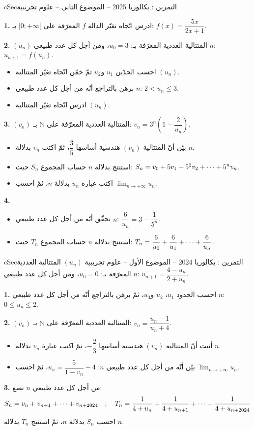 \documentclass[12pt,a4paper]{article}
\newenvironment{BOX}[2]{\begin{otherlanguage}{english}\begin{arbox}{#1}{#2}}{\end{arbox}\end{otherlanguage}}
\newcounter{exo}
\newenvironment{tamrin}[1]{\stepcounter{exo}\begin{BOX}{cSec}{التمرين \theexo: #1}}{\end{BOX}}
\renewcommand{\cdots}{\mathinner{\cdotp\cdotp\cdotp}}
\newcommand{\N}{\mathbb{N}}
\newcommand{\limn}{\displaystyle\lim_{n\to+\infty}}
\newenvironment{sq}{\begin{itemize}[leftmargin=2.4em,itemsep=3pt]}{\end{itemize}}
\newcommand{\qa}{\item[(أ)]}\newcommand{\qb}{\item[(ب)]}\newcommand{\qc}{\item[(جـ)]}\newcommand{\qd}{\item[(د)]}\newcommand{\qe}{\item[(هـ)]}
\newcommand{\QQ}[1]{\par\smallskip\textbf{#1.} }
\begin{document}
\begin{tamrin}{بكالوريا 2025 -- الموضوع الثاني -- علوم تجريبية}
\QQ{1} ادرس اتّجاه تغيّر الدالة $f$ المعرّفة على $[0;+\infty[$ بـ: $f(x)=\dfrac{5x}{2x+1}$.

\QQ{2} $(u_n)$ المتتالية العددية المعرّفة بـ: $u_0=3$، ومن أجل كل عدد طبيعي $n$: $u_{n+1}=f(u_n)$.
\begin{sq}
\qa احسب الحدّين $u_1$ و$u_2$ ثمّ خمّن اتّجاه تغيّر المتتالية $(u_n)$.
\qb برهن بالتراجع أنّه من أجل كل عدد طبيعي $n$: $2<u_n\leqslant 3$.
\qc ادرس اتّجاه تغيّر المتتالية $(u_n)$.
\end{sq}
\QQ{3} $(v_n)$ المتتالية العددية المعرّفة على $\N$ بـ: $v_n=3^n\left(1-\dfrac{2}{u_n}\right)$.
\begin{sq}
\qa بيّن أنّ المتتالية $(v_n)$ هندسية أساسها $\dfrac35$، ثمّ اكتب $v_n$ بدلالة $n$.
\qb استنتج بدلالة $n$ حساب المجموع $S_n$ حيث: $S_n=v_0+5v_1+5^2v_2+\cdots+5^nv_n$.
\qc اكتب عبارة $u_n$ بدلالة $n$، ثمّ احسب $\limn u_n$.
\end{sq}
\QQ{4}
\begin{sq}
\qa تحقّق أنّه من أجل كل عدد طبيعي $n$: $\dfrac{6}{u_n}=3-\dfrac{1}{5^n}$.
\qb استنتج بدلالة $n$ حساب المجموع $T_n$ حيث: $T_n=\dfrac{6}{u_0}+\dfrac{6}{u_1}+\cdots+\dfrac{6}{u_n}$.
\end{sq}
\end{tamrin}

\begin{tamrin}{بكالوريا 2024 -- الموضوع الأول -- علوم تجريبية}
$(u_n)$ المتتالية العددية المعرّفة بـ: $u_0=0$، ومن أجل كل عدد طبيعي $n$: $u_{n+1}=\dfrac{4-u_n}{2+u_n}$.

\QQ{1} احسب الحدود $u_1$، $u_2$ و$u_3$، ثمّ برهن بالتراجع أنّه من أجل كل عدد طبيعي $n$: $0\leqslant u_n\leqslant 2$.

\QQ{2} $(v_n)$ المتتالية العددية المعرّفة على $\N$ بـ: $v_n=\dfrac{u_n-1}{u_n+4}$.
\begin{sq}
\qa أثبت أنّ المتتالية $(v_n)$ هندسية أساسها $-\dfrac23$، ثمّ اكتب عبارة $v_n$ بدلالة $n$.
\qb بيّن أنّه من أجل كل عدد طبيعي $n$: $u_n=\dfrac{5}{1-v_n}-4$، ثمّ احسب $\limn u_n$.
\end{sq}
\QQ{3} من أجل كل عدد طبيعي $n$ نضع:
\[S_n=v_n+v_{n+1}+\cdots+v_{n+2024}\quad;\quad T_n=\frac{1}{4+u_n}+\frac{1}{4+u_{n+1}}+\cdots+\frac{1}{4+u_{n+2024}}\]
احسب $S_n$ بدلالة $n$، ثمّ استنتج $T_n$ بدلالة $n$.
\end{tamrin}
\end{document}

